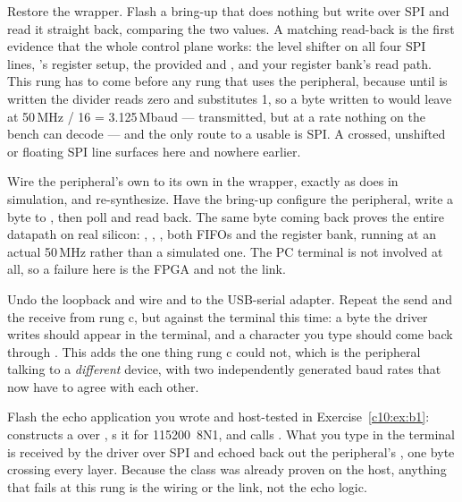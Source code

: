  Restore the wrapper. Flash a bring-up  that does
nothing but write  over SPI and read it straight back, comparing the two values. A
matching read-back is the first evidence that the whole control plane works: the level shifter on all
four SPI lines, 's register setup, the provided  and
, and your register bank's read path. This rung has to come before any rung
that uses the peripheral, because until  is written the divider reads zero and
 substitutes 1, so a byte written to  would leave at 50\,MHz / 16 =
3.125\,Mbaud --- transmitted, but at a rate nothing on the bench can decode --- and the only route to
a usable  is SPI. A crossed, unshifted or floating SPI line surfaces here and nowhere
earlier.

 Wire the peripheral's own  to
its own  in the wrapper, exactly as  does in simulation, and
re-synthesize. Have the bring-up  configure the peripheral, write a byte to
, then poll  and read  back. The same byte coming back
proves the entire datapath on real silicon: , , , both
FIFOs and the register bank, running at an actual 50\,MHz rather than a simulated one. The PC
terminal is not involved at all, so a failure here is the FPGA and not the link.

 Undo the loopback and wire  and  to the
USB-serial adapter. Repeat the send and the receive from rung c, but against the terminal this time:
a byte the driver writes should appear in the terminal, and a character you type should come back
through . This adds the one thing rung c could not, which is the peripheral talking to a
\emph{different} device, with two independently generated baud rates that now have to agree with
each other.

 Flash the echo application you wrote and host-tested in
Exercise~\ref{c10:ex:b1}:  constructs a  over ,
s it for 115200~8N1, and calls . What you type in the terminal
is received by the driver over SPI and echoed back out the peripheral's , one byte crossing
every layer. Because the class was already proven on the host, anything that fails at this rung is
the wiring or the link, not the echo logic.

